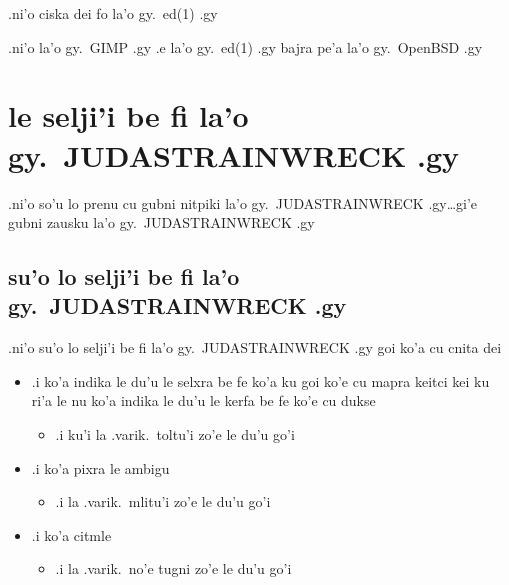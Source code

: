 \documentclass{report}
\begin{document}
.ni'o ciska dei fo la'o gy.\ ed(1) .gy

.ni'o la'o gy.\ GIMP .gy .e la'o gy.\ ed(1) .gy bajra pe'a la'o gy.\ OpenBSD .gy
\section{le selji'i be fi la'o gy.\ JUDASTRAINWRECK .gy}
.ni'o so'u lo prenu cu gubni nitpiki la'o gy.\ JUDASTRAINWRECK .gy\ldots gi'e gubni zausku la'o gy.\ JUDASTRAINWRECK .gy
\subsection{su'o lo selji'i be fi la'o gy.\ JUDASTRAINWRECK .gy}
.ni'o su'o lo selji'i be fi la'o gy.\ JUDASTRAINWRECK .gy goi ko'a cu cnita dei
\begin{itemize}
	\item .i ko'a indika le du'u le selxra be fe ko'a ku goi ko'e cu mapra keitci kei ku ri'a le nu ko'a indika le du'u le kerfa be fe ko'e cu dukse 
	\begin{itemize}
		\item .i ku'i la .varik.\ toltu'i zo'e le du'u go'i
	\end{itemize}
	\item .i ko'a pixra le ambigu
	\begin{itemize}
		\item .i la .varik.\ mlitu'i zo'e le du'u go'i
	\end{itemize}
	\item .i ko'a citmle
	\begin{itemize}
		\item .i la .varik.\ no'e tugni zo'e le du'u go'i
	\end{itemize}
\end{itemize}
\end{document}
